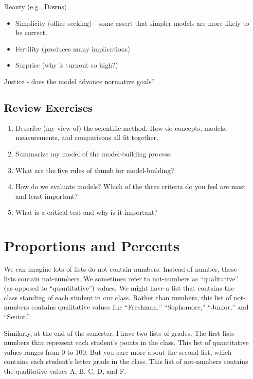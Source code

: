 \documentclass[]{book}
\providecommand{\tightlist}{%
  \setlength{\itemsep}{0pt}\setlength{\parskip}{0pt}}
\theoremstyle{definition}
\theoremstyle{definition}
\theoremstyle{definition}
\theoremstyle{remark}
\begin{document}
Beauty (e.g., Downs)

\begin{itemize}
\tightlist
\item
  Simplicity (office-seeking) - some assert that simpler models are more
  likely to be correct.
\item
  Fertility (produces many implications)
\item
  Surprise (why is turnout so high?)
\end{itemize}

Justice - does the model advance normative goals?

\section{Review Exercises}\label{review-exercises}

\begin{enumerate}
\def\labelenumi{\arabic{enumi}.}
\tightlist
\item
  Describe (my view of) the scientific method. How do concepts, models,
  measurements, and comparisons all fit together.
\item
  Summarize my model of the model-building process.
\item
  What are the five rules of thumb for model-building?
\item
  How do we evaluate models? Which of the three criteria do you feel are
  most and least important?
\item
  What is a critical test and why is it important?
\end{enumerate}

\chapter{Proportions and Percents}\label{proportions-and-percents}

We can imagine lots of lists do not contain numbers. Instead of number,
these lists contain not-numbers. We sometimes refer to not-numbers as
``qualitative'' (as opposed to ``quantitative'') values. We might have a
list that contains the class standing of each student in our class.
Rather than numbers, this list of not-numbers contains qualitative
values like ``Freshman,'' ``Sophomore,'' ``Junior,'' and ``Senior.''

Similarly, at the end of the semester, I have two lists of grades. The
first lists numbers that represent each student's points in the class.
This list of quantitative values ranges from 0 to 100. But you care more
about the second list, which contains each student's letter grade in the
class. This list of not-numbers contains the qualitative values A, B, C,
D, and F.
\end{document}

